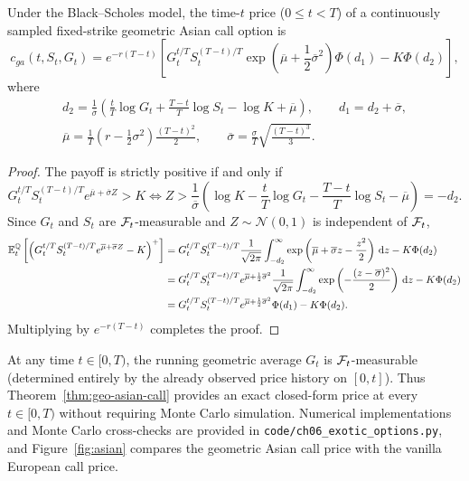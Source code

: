 \begin{theorem}\label{thm:geo-asian-call}
    Under the Black--Scholes model, the time-$t$ price ($0 \le t < T$) of a continuously sampled fixed-strike geometric Asian call option is
    \[
    c_{ga}(t, S_t, G_t) = e^{-r(T-t)}\left[G_t^{t/T} S_t^{(T-t)/T}\exp\left(\overline{\mu} + \frac{1}{2}\overline{\sigma}^2\right)\Phi(d_1) - K\Phi(d_2)\right],
    \]
    where
    \[
    \begin{gathered}
        d_2 = \frac{1}{\overline{\sigma}}\left(\frac{t}{T}\log G_t + \frac{T - t}{T}\log S_t - \log K + \overline{\mu}\right), \qquad d_1 = d_2 + \overline{\sigma}, \\
        \overline{\mu} = \frac{1}{T}\left(r - \frac{1}{2}\sigma^2\right)\frac{(T - t)^2}{2}, \qquad \overline{\sigma} = \frac{\sigma}{T}\sqrt{\frac{(T - t)^3}{3}}.
    \end{gathered}
    \]
\end{theorem}
\begin{proof}
    The payoff is strictly positive if and only if
    \[
    G_t^{t/T} S_t^{(T-t)/T} e^{\overline{\mu} + \overline{\sigma} Z} > K \iff Z > \frac{1}{\overline{\sigma}}\left(\log K - \frac{t}{T}\log G_t - \frac{T - t}{T}\log S_t - \overline{\mu}\right) = -d_2.
    \]
    Since $G_t$ and $S_t$ are $\mathcal{F}_t$-measurable and $Z \sim \mathcal{N}(0, 1)$ is independent of $\mathcal{F}_t$,
    \[
    \begin{aligned}
        \mathbb{E}_t^{\mathbb{Q}}\left[\left(G_t^{t/T} S_t^{(T-t)/T} e^{\overline{\mu} + \overline{\sigma} Z} - K\right)^+\right]
        &= G_t^{t/T} S_t^{(T-t)/T}\frac{1}{\sqrt{2\pi}}\int_{-d_2}^{\infty} \exp\left(\overline{\mu} + \overline{\sigma} z - \frac{z^2}{2}\right)\,\mathrm{d} z - K\Phi(d_2) \\
        &= G_t^{t/T} S_t^{(T-t)/T} e^{\overline{\mu} + \frac{1}{2}\overline{\sigma}^2}\frac{1}{\sqrt{2\pi}}\int_{-d_2}^{\infty} \exp\left(-\frac{(z - \overline{\sigma})^2}{2}\right)\,\mathrm{d} z - K\Phi(d_2) \\
        &= G_t^{t/T} S_t^{(T-t)/T} e^{\overline{\mu} + \frac{1}{2}\overline{\sigma}^2}\Phi(d_1) - K\Phi(d_2).
    \end{aligned}
    \]
    Multiplying by $e^{-r(T-t)}$ completes the proof.
\end{proof}

\begin{remark}
    At any time $t \in [0, T)$, the running geometric average $G_t$ is $\mathcal{F}_t$-measurable (determined entirely by the already observed price history on $[0, t]$). Thus Theorem~\ref{thm:geo-asian-call} provides an exact closed-form price at every $t \in [0, T)$ without requiring Monte Carlo simulation. Numerical implementations and Monte Carlo cross-checks are provided in \texttt{code/ch06\_exotic\_options.py}, and Figure~\ref{fig:asian} compares the geometric Asian call price with the vanilla European call price.
\end{remark}

